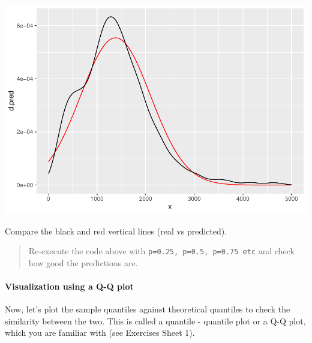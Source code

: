 \documentclass[
]{book}
\begin{document}
\includegraphics{_main_files/figure-latex/unnamed-chunk-106-1.pdf}

Compare the black and red vertical lines (real vs predicted).

\begin{quote}
Re-execute the code above with \texttt{p=0.25,\ p=0.5,\ p=0.75\ etc} and check how good the predictions are.
\end{quote}

\hypertarget{visualization-using-a-q-q-plot}{%
\paragraph{Visualization using a Q-Q plot}\label{visualization-using-a-q-q-plot}}

Now, let's plot the sample quantiles against theoretical quantiles to check the similarity between the two. This is called a quantile - quantile plot or a Q-Q plot, which you are familiar with (see Exercises Sheet 1).
\end{document}
